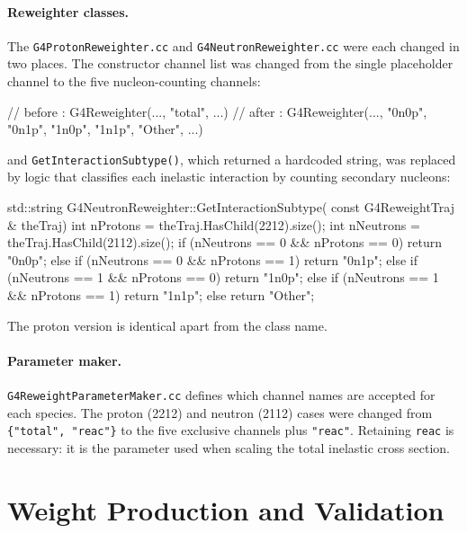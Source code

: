 \documentclass[%
article,
nofootinbib
]{revtex4-2}
\begin{document}
\paragraph{Reweighter classes.} The \texttt{G4ProtonReweighter.cc} and
\texttt{G4NeutronReweighter.cc} were each changed in two places. The constructor
channel list was changed from the single placeholder channel to the five
nucleon-counting channels:

\begin{cppcode}
// before
: G4Reweighter(..., {"total"}, ...)
// after
: G4Reweighter(..., {"0n0p", "0n1p", "1n0p", "1n1p", "Other"}, ...)
\end{cppcode}

\noindent
and \texttt{GetInteractionSubtype()}, which returned a hardcoded string, was
replaced by logic that classifies each inelastic interaction by counting
secondary nucleons:

\begin{cppcode}
std::string G4NeutronReweighter::GetInteractionSubtype(
    const G4ReweightTraj & theTraj) {
  int nProtons  = theTraj.HasChild(2212).size();
  int nNeutrons = theTraj.HasChild(2112).size();
  if      (nNeutrons == 0 && nProtons == 0) return "0n0p";
  else if (nNeutrons == 0 && nProtons == 1) return "0n1p";
  else if (nNeutrons == 1 && nProtons == 0) return "1n0p";
  else if (nNeutrons == 1 && nProtons == 1) return "1n1p";
  else                                      return "Other";
}
\end{cppcode}

\noindent
The proton version is identical apart from the class name. 

\paragraph{Parameter maker.} \texttt{G4ReweightParameterMaker.cc} defines which
channel names are accepted for each species. The proton (2212) and neutron
(2112) cases were changed from \texttt{\{"total", "reac"\}} to the five
exclusive channels plus \texttt{"reac"}. Retaining \texttt{reac} is necessary:
it is the parameter used when scaling the total inelastic cross section.


\section{\label{sec:weights}Weight Production and Validation}
\end{document}
